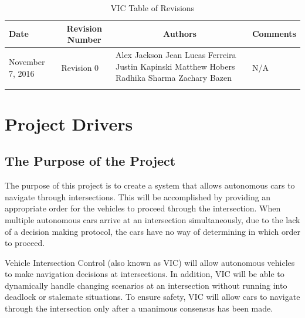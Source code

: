 \documentclass [12pt]{article}
\begin{document}
\thispagestyle{empty}
\begin{longtable}{| p{ } | p{ } | p{ } | p{ } |}

\hline 
\centering \textbf{Date} & 
\multicolumn{1}{c}{\textbf {Revision Number}} &
\multicolumn{1}{|c}{\textbf {Authors}} & 
\multicolumn{1}{|c|}{\textbf {Comments}} \\ \hline

\multirow{4}{*}{\centering November 7, 2016}  & 
\multirow{4}{*}{Revision 0}& 
{Alex Jackson \newline
Jean Lucas Ferreira \newline
Justin Kapinski\newline
Matthew Hobers\newline
Radhika Sharma\newline
Zachary Bazen}
&
 \multirow{4}{*}{N/A} \\ 
\hline 

\caption{VIC Table of Revisions} 
\end{longtable}
\pagebreak



\section {\textbf{Project Drivers}}


\subsection{\large The Purpose of the Project} 
The purpose of this project is to create a system that allows autonomous cars to navigate through  intersections. This will be accomplished by providing an appropriate order for the vehicles to proceed through the intersection. When multiple autonomous cars arrive at an intersection simultaneously, due to the lack of a decision making protocol, the cars have no way of determining in which order to proceed. \newline


Vehicle Intersection Control (also known as VIC) will allow autonomous vehicles to make navigation decisions at intersections. In addition, VIC will be able to dynamically handle changing scenarios at an intersection without running into deadlock or stalemate situations. To ensure safety, VIC will allow cars to navigate through the intersection only after a unanimous consensus has been made. \newline
\end{document}
